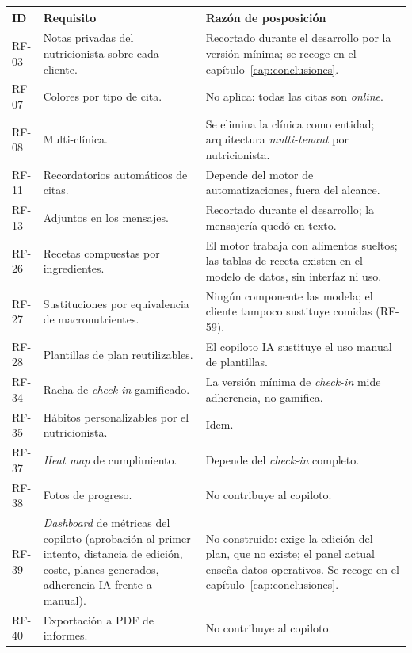 \begin{table}[htbp]
\centering
\footnotesize
\begin{tabular}{|p{1.9cm}|p{6.6cm}|p{4.6cm}|}
\hline
\textbf{ID} & \textbf{Requisito} & \textbf{Razón de posposición} \\
\hline
RF-03 & Notas privadas del nutricionista sobre cada cliente. & Recortado durante el desarrollo por la versión mínima; se recoge en el capítulo~\ref{cap:conclusiones}. \\
\hline
RF-07 & Colores por tipo de cita. & No aplica: todas las citas son \textit{online}. \\
\hline
RF-08 & Multi-clínica. & Se elimina la clínica como entidad; arquitectura \textit{multi-tenant} por nutricionista. \\
\hline
RF-11 & Recordatorios automáticos de citas. & Depende del motor de automatizaciones, fuera del alcance. \\
\hline
RF-13 & Adjuntos en los mensajes. & Recortado durante el desarrollo; la mensajería quedó en texto. \\
\hline
RF-26 & Recetas compuestas por ingredientes. & El motor trabaja con alimentos sueltos; las tablas de receta existen en el modelo de datos, sin interfaz ni uso. \\
\hline
RF-27 & Sustituciones por equivalencia de macronutrientes. & Ningún componente las modela; el cliente tampoco sustituye comidas (RF-59). \\
\hline
RF-28 & Plantillas de plan reutilizables. & El copiloto IA sustituye el uso manual de plantillas. \\
\hline
RF-34 & Racha de \textit{check-in} gamificado. & La versión mínima de \textit{check-in} mide adherencia, no gamifica. \\
\hline
RF-35 & Hábitos personalizables por el nutricionista. & Idem. \\
\hline
RF-37 & \textit{Heat map} de cumplimiento. & Depende del \textit{check-in} completo. \\
\hline
RF-38 & Fotos de progreso. & No contribuye al copiloto. \\
\hline
RF-39 & \textit{Dashboard} de métricas del copiloto (aprobación al primer intento, distancia de edición, coste, planes generados, adherencia IA frente a manual). & No construido: exige la edición del plan, que no existe; el panel actual enseña datos operativos. Se recoge en el capítulo~\ref{cap:conclusiones}. \\
\hline
RF-40 & Exportación a PDF de informes. & No contribuye al copiloto. \\

\end{tabular}
\end{table}
